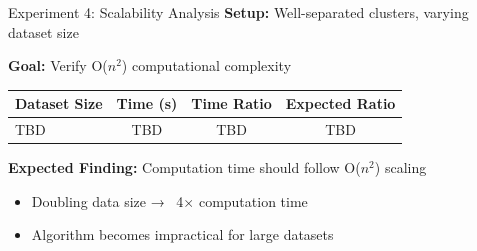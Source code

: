 \begin{frame}{Experiment 4: Scalability Analysis}
    \textbf{Setup:} Well-separated clusters, varying dataset size

    \vspace{0.3cm}

    \textbf{Goal:} Verify O($n^2$) computational complexity

    \vspace{0.3cm}

    \begin{table}
        \centering
        \begin{tabular}{lccc}
            \toprule
            \textbf{Dataset Size} & \textbf{Time (s)} & \textbf{Time Ratio} & \textbf{Expected Ratio} \\
            \midrule
            TBD & TBD & TBD & TBD \\
            \bottomrule
        \end{tabular}
    \end{table}

    \vspace{0.3cm}

    \small{\textbf{Expected Finding:} Computation time should follow O($n^2$) scaling}
    \begin{itemize}
        \small
        \item Doubling data size → ~4$\times$ computation time
        \item Algorithm becomes impractical for large datasets
    \end{itemize}
\end{frame}

